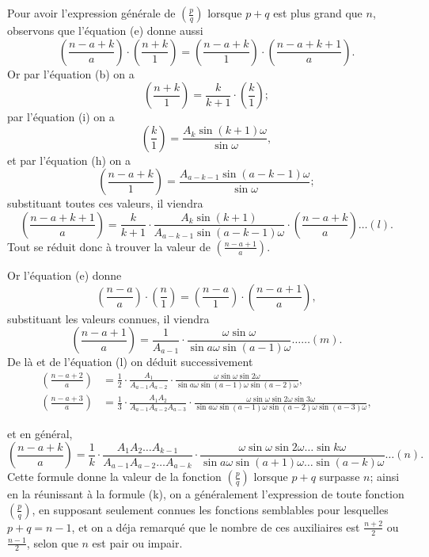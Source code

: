 \documentclass{article}
\begin{document}
Pour avoir l'expression générale de $\left(\frac{p}{q}\right)$ lorsque $p+q$ est plus grand que $n$, observons que l'équation (e) donne aussi
\[ \left(\frac{n-a+k}{a}\right)\cdot\left(\frac{n+k}{1}\right)=\left(\frac{n-a+k}{1}\right)\cdot\left(\frac{n-a+k+1}{a}\right). \]
Or par l'équation (b) on a
\[ \left(\frac{n+k}{1}\right)=\frac{k}{k+1}\cdot\left(\frac{k}{1}\right); \]
par l'équation (i) on a
\[ \left(\frac{k}{1}\right)=\frac{A_{k}\sin(k+1)\omega}{\sin\omega}, \]
et par l'équation (h) on a
\[ \left(\frac{n-a+k}{1}\right)=\frac{A_{a-k-1}\sin(a-k-1)\omega}{\sin\omega}; \]
substituant toutes ces valeurs, il viendra
\[ \left(\frac{n-a+k+1}{a}\right)=\frac{k}{k+1}\cdot\frac{A_{k}\sin(k+1)}{A_{a-k-1}\sin(a-k-1)\omega}\cdot\left(\frac{n-a+k}{a}\right)\ldots(l). \]
Tout se réduit donc à trouver la valeur de $\left(\frac{n-a+1}{a}\right)$.

Or l'équation (e) donne
\[ \left(\frac{n-a}{a}\right)\cdot\left(\frac{n}{1}\right)=\left(\frac{n-a}{1}\right)\cdot\left(\frac{n-a+1}{a}\right), \]
substituant les valeurs connues, il viendra
\[ \left(\frac{n-a+1}{a}\right)=\frac{1}{A_{a-1}}\cdot\frac{\omega\sin\omega}{\sin a\omega\sin(a-1)\omega}\ldots\ldots(m). \]
De là et de l'équation (l) on déduit successivement
\[ \begin{aligned} \left(\frac{n-a+2}{a}\right)&=\frac{1}{2}\cdot\frac{A_{1}}{A_{a-1}A_{a-2}}\cdot\frac{\omega\sin\omega\sin 2\omega}{\sin a\omega\sin(a-1)\omega\sin(a-2)\omega},\\ \left(\frac{n-a+3}{a}\right)&=\frac{1}{3}\cdot\frac{A_{1}A_{2}}{A_{a-1}A_{a-2}A_{a-3}}\cdot\frac{\omega\sin\omega\sin 2\omega\sin 3\omega}{\sin a\omega\sin(a-1)\omega\sin(a-2)\omega\sin(a-3)\omega}, \end{aligned} \]

et en général,
\[ \left(\frac{n-a+k}{a}\right)=\frac{1}{k}\cdot\frac{A_{1}A_{2}\ldots A_{k-1}}{A_{a-1}A_{a-2}\ldots A_{a-k}}\cdot\frac{\omega\sin\omega\sin 2\omega\ldots\sin k\omega}{\sin a\omega\sin(a+1)\omega\ldots\sin(a-k)\omega}\ldots(n). \]
Cette formule donne la valeur de la fonction $\left(\frac{p}{q}\right)$ lorsque $p+q$ surpasse $n$; ainsi en la réunissant à la formule (k), on a généralement l'expression de toute fonction $\left(\frac{p}{q}\right)$, en supposant seulement connues les fonctions semblables pour lesquelles $p+q=n-1$, et on a déja remarqué que le nombre de ces auxiliaires est $\frac{n+2}{2}$ ou $\frac{n-1}{2}$, selon que $n$ est pair ou impair.
\end{document}
